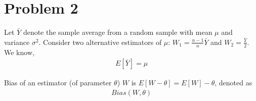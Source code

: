 \section*{Problem 2}

\noindent Let $\bar{Y}$ denote the sample average from a random sample with mean $\mu$ and variance $\sigma^2$. Consider two alternative estimators of $\mu$: $W_1 = \frac{n - 1}{n}\bar{Y}$ and $W_2 = \frac{\bar{Y}}{2}$.
\\
We know,
\begin{align*}
E[\bar{Y}] = \mu 
\end{align*}

\noindent Bias of an estimator (of parameter $\theta$) $W$ is $E[W - \theta] = E[W] - \theta$, denoted as 
\begin{align*}
Bias(W , \theta)
\end{align*}

